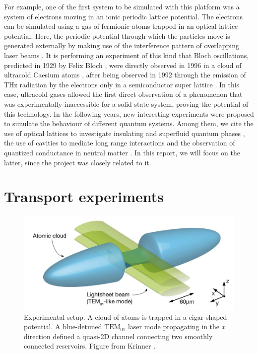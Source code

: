 For example, one of the first system to be simulated with this platform was a system of electrons moving in an ionic periodic lattice potential.  The electrons can be simulated using a gas of fermionic atoms trapped in an optical lattice potential. Here, the periodic potential
through which the particles move is generated externally by making
use of the interference pattern of overlapping laser beams \cite{bloch2008}. It is performing an experiment of this kind that Bloch oscillations, predicted in 1929 by Felix Bloch \cite{bloch1929a}, were directly observed in 1996 in a cloud of ultracold Caesium atoms \cite{dahan1996}, after being observed in 1992 through the emission of THz radiation by the electrons only in a semiconductor super lattice \cite{feldmann1992}. In this case, ultracold gases allowed the first direct observation of a phenomenon that was experimentally inaccessible for a solid state system, proving the potential of this technology. In the following years, new interesting experiments were proposed to simulate the behaviour of different quantum systems. Among them, we cite the use of optical lattices to investigate insulating and superfluid quantum phases \cite{greiner2002}, the use of cavities to mediate long range interactions \cite{landig2016} and the observation of quantized conductance in neutral matter \cite{krinner2015}. In this report, we will focus on the latter, since the project was closely related to it.

\section{Transport experiments}
\begin{figure}
    \includegraphics[width=\textwidth]{chapters/chapter_1/figures/reservoir.png}
    \caption{Experimental setup. A cloud of atoms is trapped in a cigar-shaped potential. A blue-detuned $\text{TEM}_{01}$ laser mode propagating in the $x$ direction defined a quasi-2D channel connecting two smoothly connected reservoirs. Figure from Krinner \cite{krinner2015b}.}
    \label{fig:lithium_apparatus}
\end{figure}

